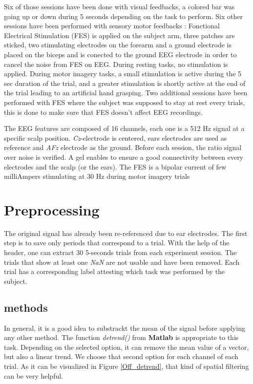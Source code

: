 \documentclass{article} %
\begin{document}
Six of those sessions have been done with visual feedbacks, a colored bar was going up or down during 5 seconds depending on the task to perform.  
Six other sessions have been performed with sensory motor feedbacks : Fonctional Electrical Stimulation (FES) is applied on the subject arm, three patches are sticked, two stimulating electrodes on the forearm and a ground electrode is placed on the biceps and is conected to the ground EEG electrode in order to cancel the noise from FES on EEG. During resting tasks, no stimulation is applied. During motor imagery tasks, a small stimulation is active during the 5 sec duration of the trial, and a greater stimulation is shortly active at the end of the trial leading to an artificial hand grasping.
Two additional sessions have been performed with FES where the subject was supposed to stay at rest every trials, this is done to make sure that FES doesn't affect EEG recordings.

The EEG features are composed of 16 channels, each one is a 512 Hz signal at a specific scalp position. \textit{Cz}-electrode is centered, ears electrodes are used as reference and \textit{AFz} electrode as the ground. Before each session, the ratio signal over noise is verified. A gel enables to ensure a good connectivity between every electrodes and the scalp (or the ears).
The FES is a bipolar current of few milliAmpers stimulating at 30 Hz during motor imagery trials


\section{Preprocessing}

The original signal has already been re-referenced due to ear electrodes. The first step is to save only periods that correspond to a trial. With the help of the header, one can extract 30 5-seconds trials from each experiment session. The trials that show at least one \textit{NaN} are not usable and have been removed. Each trial has a corresponding label attesting which task was performed by the subject.

\subsection{methods}

In general, it is a good idea to substrackt the mean of the signal before applying any other method. The function \textit{detrend()} from \textbf{Matlab} is appropriate to this task. Depending on the selected option, it can remove the mean value of a vector, but also a linear trend. We choose that second option for each channel of each trial. As it can be visualized in Figure \ref{Off_detrend}, that kind of spatial filtering can be very helpful.
\end{document}
